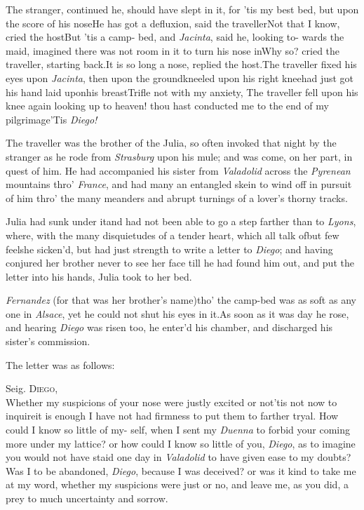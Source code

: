 \documentclass{article}
\begin{document}
\tsk The stranger, continued he, should have slept in
it, for ’tis my best bed, but upon the score of his
nose\tsk He has got a defluxion, said the
traveller\tsk Not that 
I know, cried the host\tsk But ’tis a camp-\break 
bed, and \textit{Jacinta}, said he, looking to-\break 
wards the maid, imagined there was not room in
it to turn his nose in\tsk Why so? cried the traveller,
starting back.\tsk It is so long a nose, replied the
host.\tsk The traveller fixed his eyes upon
\textit{Jacinta}, then upon the ground\tsk kneeled upon his
right
knee\tsk had just got his hand laid upon\break his
breast\tsk Trifle not with my anxiety,
\break
\tsk The traveller fell
upon his knee again\tsk\break
{} 
looking up to heaven! thou hast conducted me to the end of
my pilgrimage\break\tsh ’Tis \textit{Diego!}

The traveller was the brother of the Julia, so often
invoked that night by the stranger as he rode from \textit{Strasburg}
upon his mule; and was come, on her part,\break 
in quest of him. He had accompanied\break
his sister from \textit{Valadolid} across the
\textit{Pyrenean} mountains thro’ \textit{France}, and had\break
many an entangled skein to wind off in pursuit of him thro’ the many
meanders and abrupt turnings of a lover’s thorny tracks.

\tsk Julia had sunk under it\tsk and had
not been able to go a step farther than to \textit{Lyons}, where,
with the many disquietudes of a tender heart, which all talk
of\tsk but few feel\tsk she sicken’d, but had just
strength to write a letter to \textit{Diego}; and having conjured her
brother never to see her face till he had found him out, and put
the letter into his hands, Julia took to her bed.

\textit{Fernandez} (for that was her brother’s
name)\tsh tho’ the camp-bed was as soft as any one
in \textit{Alsace}, yet he could not shut his eyes in
it.\tsk As soon as it was day he rose, and hearing
\textit{Diego} was risen too,\break
he enter’d his chamber, and discharged his
sister’s commission.

The letter was as follows:

\indent\quad Seig. \textsc{Diego},\\
\indent\lqq Whether my suspicions of your nose\break
\lqq were justly excited or not\tsk ’tis not now\break
\lqq to inquire\tsk it is enough I have not\break
\lqq had firmness to put them to farther\break
\lqq tryal.\break
\break
\indent\lqq How could I know so little of my-\break
\lqq self, when I sent my \textit{Duenna} to forbid\break
\lqq your coming more under my lattice?\break
\lqq or how could I know so little of you,\break
\lqq \textit{Diego}, as to imagine you would not\break
\lqq have staid one day in \textit{Valadolid} to have\break
\lqq given ease to my doubts?\tsk Was I to\break
\lqq be abandoned, \textit{Diego}, because I was\break
\lqq deceived? or was it kind to take me\break
\lqq at my word, whether my suspicions\break
\lqq were just or no, and leave me, as you\break
\lqq did, a prey to much uncertainty and\break
\lqq sorrow.
\end{document}
